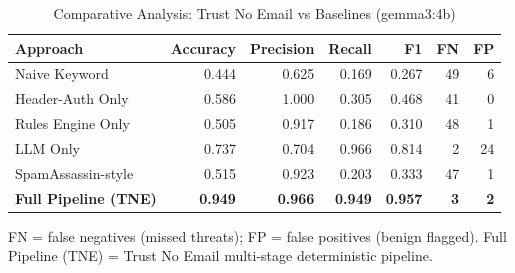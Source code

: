 \begin{table}[h]
\centering
\caption{Comparative Analysis: Trust No Email vs Baselines (gemma3:4b)}
\label{tab:e10_comparative}
\begin{tabular}{l r r r r r r}
\hline
Approach & Accuracy & Precision & Recall & F1 & FN & FP \\
\hline
Naive Keyword & 0.444 & 0.625 & 0.169 & 0.267 & 49 & 6 \\
Header-Auth Only & 0.586 & 1.000 & 0.305 & 0.468 & 41 & 0 \\
Rules Engine Only & 0.505 & 0.917 & 0.186 & 0.310 & 48 & 1 \\
LLM Only & 0.737 & 0.704 & 0.966 & 0.814 & 2 & 24 \\
SpamAssassin-style & 0.515 & 0.923 & 0.203 & 0.333 & 47 & 1 \\
\textbf{Full Pipeline (TNE)} & \textbf{0.949} & \textbf{0.966} & \textbf{0.949} & \textbf{0.957} & \textbf{3} & \textbf{2} \\
\hline
\end{tabular}
\vspace{2mm}
\footnotesize{FN = false negatives (missed threats); FP = false positives (benign flagged). Full Pipeline (TNE) = Trust No Email multi-stage deterministic pipeline.}
\end{table}